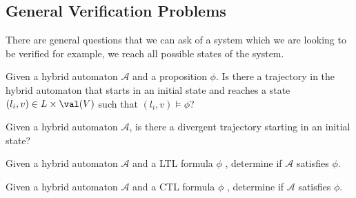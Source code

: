 \subsection{General Verification Problems}
There are general questions that we can ask of a system which we are looking to be verified for example, we reach all possible states of the system.

\begin{prob}
\label{prob:reach}
Given a hybrid automaton $\mathcal{A}$ and a proposition $\phi$. Is there a trajectory in the hybrid automaton that starts in an initial state and reaches a state $(l_{i},v)\in L\times\val(V)$ such that $(l_{i},v)\models\phi$?
\end{prob}

\begin{prob}
\label{prob:empty}
Given a hybrid automaton $\mathcal{A}$, is there a divergent trajectory starting in an initial state?
\end{prob}


\begin{prob}
\label{prob:ltl}
Given a hybrid automaton $\mathcal{A}$ and a LTL formula $\phi$ , determine if $\mathcal{A}$ satisfies $\phi$.
\end{prob}

\begin{prob}
\label{prob:ctl}
Given a hybrid automaton $\mathcal{A}$ and a CTL formula $\phi$ , determine if $\mathcal{A}$ satisfies $\phi$.
\end{prob}




